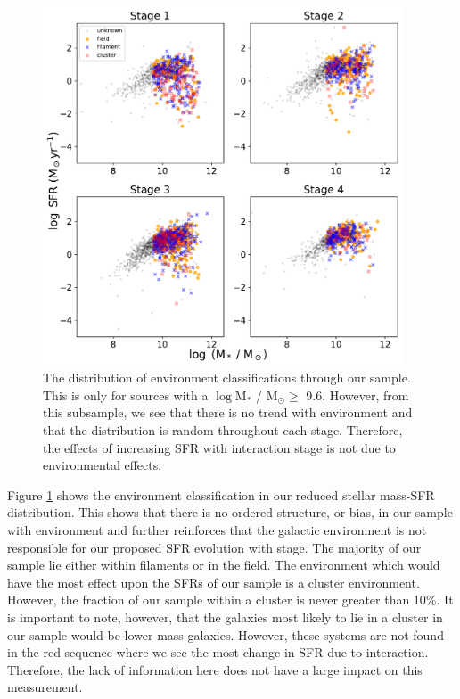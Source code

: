 \begin{figure}
    \centering
    \includegraphics[width=0.95\textwidth]{Chapter3/figures/sfr-mass-density.pdf}
    \caption{The distribution of environment classifications through our sample. This is only for sources with a $\log$M$_*$ / M$_\odot \geq$ 9.6. However, from this subsample, we see that there is no trend with environment and that the distribution is random throughout each stage. Therefore, the effects of increasing SFR with interaction stage is not due to environmental effects.}
    \label{fig:dens-sfr-mass}
\end{figure}

Figure \ref{fig:dens-sfr-mass} shows the environment classification in our reduced stellar mass-SFR distribution. This shows that there is no ordered structure, or bias, in our sample with environment and further reinforces that the galactic environment is not responsible for our proposed SFR evolution with stage. The majority of our sample lie either within filaments or in the field. The environment which would have the most effect upon the SFRs of our sample is a cluster environment. However, the fraction of our sample within a cluster is never greater than 10\%. It is important to note, however, that the galaxies most likely to lie in a cluster in our sample would be lower mass galaxies. However, these systems are not found in the red sequence where we see the most change in SFR due to interaction. Therefore, the lack of information here does not have a large impact on this measurement. 

